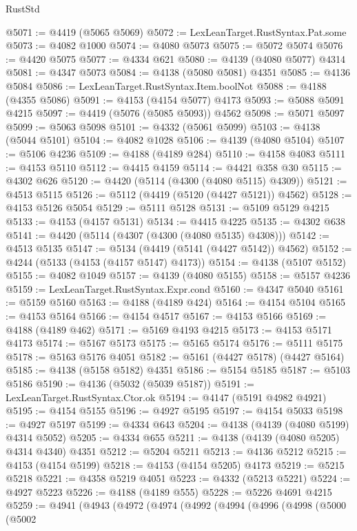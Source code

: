 \begin{lexlean}{RustStd}
\begin{coremodule}
@5071 := @4419 (@5065 @5069)
@5072 := LexLeanTarget.RustSyntax.Pat.some
@5073 := @4082 @1000
@5074 := @4080 @5073
@5075 := @5072 @5074
@5076 := @4420 @5075
@5077 := @4334 @621
@5080 := @4139 (@4080 @5077) @4314
@5081 := @4347 @5073
@5084 := @4138 (@5080 @5081) @4351
@5085 := @4136 @5084
@5086 := LexLeanTarget.RustSyntax.Item.boolNot
@5088 := @4188 (@4355 @5086)
@5091 := @4153 (@4154 @5077) @4173
@5093 := @5088 @5091 @4215
@5097 := @4419 (@5076 (@5085 @5093)) @4562
@5098 := @5071 @5097
@5099 := @5063 @5098
@5101 := @4332 (@5061 @5099)
@5103 := @4138 (@5044 @5101)
@5104 := @4082 @1028
@5106 := @4139 (@4080 @5104)
@5107 := @5106 @4236
@5109 := @4188 (@4189 @284)
@5110 := @4158 @4083
@5111 := @4153 @5110
@5112 := @4415 @4159
@5114 := @4421 @358 @30
@5115 := @4302 @626
@5120 := @4420 (@5114 (@4300 (@4080 @5115) @4309))
@5121 := @4513 @5115
@5126 := @5112 (@4419 (@5120 (@4427 @5121)) @4562)
@5128 := @4153 @5126 @5054
@5129 := @5111 @5128
@5131 := @5109 @5129 @4215
@5133 := @4153 (@4157 @5131)
@5134 := @4415 @4225
@5135 := @4302 @638
@5141 := @4420 (@5114 (@4307 (@4300 (@4080 @5135) @4308)))
@5142 := @4513 @5135
@5147 := @5134 (@4419 (@5141 (@4427 @5142)) @4562)
@5152 := @4244 (@5133 (@4153 (@4157 @5147) @4173))
@5154 := @4138 (@5107 @5152)
@5155 := @4082 @1049
@5157 := @4139 (@4080 @5155)
@5158 := @5157 @4236
@5159 := LexLeanTarget.RustSyntax.Expr.cond
@5160 := @4347 @5040
@5161 := @5159 @5160
@5163 := @4188 (@4189 @424)
@5164 := @4154 @5104
@5165 := @4153 @5164
@5166 := @4154 @4517
@5167 := @4153 @5166
@5169 := @4188 (@4189 @462)
@5171 := @5169 @4193 @4215
@5173 := @4153 @5171 @4173
@5174 := @5167 @5173
@5175 := @5165 @5174
@5176 := @5111 @5175
@5178 := @5163 @5176 @4051
@5182 := @5161 (@4427 @5178) (@4427 @5164)
@5185 := @4138 (@5158 @5182) @4351
@5186 := @5154 @5185
@5187 := @5103 @5186
@5190 := @4136 (@5032 (@5039 @5187))
@5191 := LexLeanTarget.RustSyntax.Ctor.ok
@5194 := @4147 (@5191 @4982 @4921)
@5195 := @4154 @5155
@5196 := @4927 @5195
@5197 := @4154 @5033
@5198 := @4927 @5197
@5199 := @4334 @643
@5204 := @4138 (@4139 (@4080 @5199) @4314 @5052)
@5205 := @4334 @655
@5211 := @4138 (@4139 (@4080 @5205) @4314 @4340) @4351
@5212 := @5204 @5211
@5213 := @4136 @5212
@5215 := @4153 (@4154 @5199)
@5218 := @4153 (@4154 @5205) @4173
@5219 := @5215 @5218
@5221 := @4358 @5219 @4051
@5223 := @4332 (@5213 @5221)
@5224 := @4927 @5223
@5226 := @4188 (@4189 @555)
@5228 := @5226 @4691 @4215
@5259 := @4941
    (@4943
      (@4972
        (@4974
          (@4992
            (@4994
              (@4996
                (@4998
                  (@5000
                    (@5002

\end{coremodule}
\end{lexlean}
